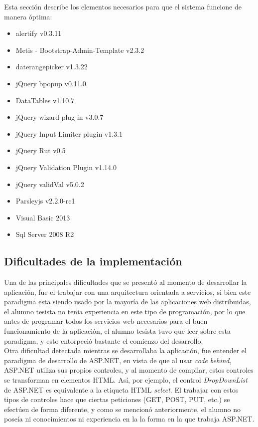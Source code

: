 Esta sección describe los elementos necesarios para que el sistema funcione de manera óptima:

\begin{itemize}
	\item alertify v0.3.11
	\item Metis - Bootstrap-Admin-Template v2.3.2
	\item daterangepicker v1.3.22
	\item jQuery  bpopup v0.11.0
	\item DataTables v1.10.7
	\item jQuery wizard plug-in v3.0.7
	\item jQuery Input Limiter plugin v1.3.1
	\item jQuery Rut v0.5
	\item jQuery Validation Plugin v1.14.0
	\item jQuery validVal v5.0.2
	\item Parsleyjs v2.2.0-rc1
	\item Visual Basic 2013
	\item Sql Server 2008 R2\end{itemize}


\subsection{Dificultades de la implementación} \label{Dificultades}



Una de las principales dificultades que se presentó al momento de desarrollar la aplicación, fue el trabajar con una arquitectura orientada a servicios, si bien este paradigma esta siendo usado por la mayoría de las aplicaciones web distribuidas, el alumno  tesista no tenia experiencia en este tipo de programación, por lo que antes de programar todos los servicios web necesarios para el buen funcionamiento de la aplicación, el alumno tesista tuvo que leer sobre esta paradigma, y esto entorpeció bastante el comienzo del desarrollo.\\

Otra dificultad detectada mientras se desarrollaba la aplicación, fue entender el paradigma de desarrollo de ASP.NET, en vista de que al usar \textit{code behind}, ASP.NET utiliza sus propios controles, y  al momento de compilar, estos controles se transforman en elementos HTML. Así, por ejemplo, el control \textit{DropDownList} de ASP.NET es equivalente a la etiqueta HTML \textit{select}. El trabajar con estos tipos de  controles hace que ciertas peticiones (GET, POST, PUT, etc.) se efectúen de forma diferente, y como se mencionó anteriormente, el alumno no poseía ni conocimientos ni experiencia en la la forma en la que trabaja ASP.NET.
\\

